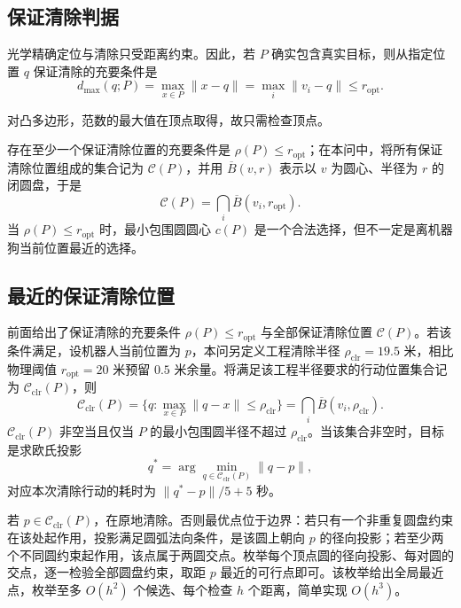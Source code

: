 \documentclass[UTF8,a4paper,zihao=-4,fontset=none]{ctexart}
\begin{document}
\subsection{保证清除判据}

光学精确定位与清除只受距离约束。因此，若 \(P\) 确实包含真实目标，则从指定位置 \(q\) 保证清除的充要条件是
\begin{equation}
  d_{\max}(q;P)=\max_{x\in P}\lVert x-q\rVert=\max_i\lVert v_i-q\rVert\le r_{\mathrm{opt}} .
  \label{eq:clear-condition}
\end{equation}

对凸多边形，范数的最大值在顶点取得，故只需检查顶点。

存在至少一个保证清除位置的充要条件是 \(\rho(P)\le r_{\mathrm{opt}}\)；在本问中，将所有保证清除位置组成的集合记为 \(\mathcal C(P)\)，并用 \(\overline B(v,r)\) 表示以 \(v\) 为圆心、半径为 \(r\) 的闭圆盘，于是
\begin{equation}
  \mathcal C(P)=\bigcap_i\overline{B}(v_i,r_{\mathrm{opt}}).
  \label{eq:clear-set}
\end{equation}
当 \(\rho(P)\le r_{\mathrm{opt}}\) 时，最小包围圆圆心 \(c(P)\) 是一个合法选择，但不一定是离机器狗当前位置最近的选择。

\subsection{最近的保证清除位置}

前面给出了保证清除的充要条件 \(\rho(P)\le r_{\mathrm{opt}}\) 与全部保证清除位置 \(\mathcal C(P)\)。若该条件满足，设机器人当前位置为 \(p\)，本问另定义工程清除半径 \(\rho_{\mathrm{clr}}=19.5\) 米，相比物理阈值 \(r_{\mathrm{opt}}=20\) 米预留 \(0.5\) 米余量。将满足该工程半径要求的行动位置集合记为 \(\mathcal C_{\mathrm{clr}}(P)\)，则
\begin{equation}
  \mathcal C_{\mathrm{clr}}(P)=\{q:\max_{x\in P}\lVert q-x\rVert\le\rho_{\mathrm{clr}}\}
  =\bigcap_{i}\overline{B}(v_i,\rho_{\mathrm{clr}}).
  \label{eq:clear-proj}
\end{equation}
\(\mathcal C_{\mathrm{clr}}(P)\) 非空当且仅当 \(P\) 的最小包围圆半径不超过 \(\rho_{\mathrm{clr}}\)。当该集合非空时，目标是求欧氏投影
\begin{equation}
  q^*=\arg\min_{q\in \mathcal C_{\mathrm{clr}}(P)}\lVert q-p\rVert ,
\end{equation}
对应本次清除行动的耗时为 \(\lVert q^*-p\rVert/5+5\) 秒。

若 \(p\in \mathcal C_{\mathrm{clr}}(P)\)，在原地清除。否则最优点位于边界：若只有一个非重复圆盘约束在该处起作用，投影满足圆弧法向条件，是该圆上朝向 \(p\) 的径向投影；若至少两个不同圆约束起作用，该点属于两圆交点。枚举每个顶点圆的径向投影、每对圆的交点，逐一检验全部圆盘约束，取距 \(p\) 最近的可行点即可。该枚举给出全局最近点，枚举至多 \(O(h^2)\) 个候选、每个检查 \(h\) 个距离，简单实现 \(O(h^3)\)。
\end{document}
